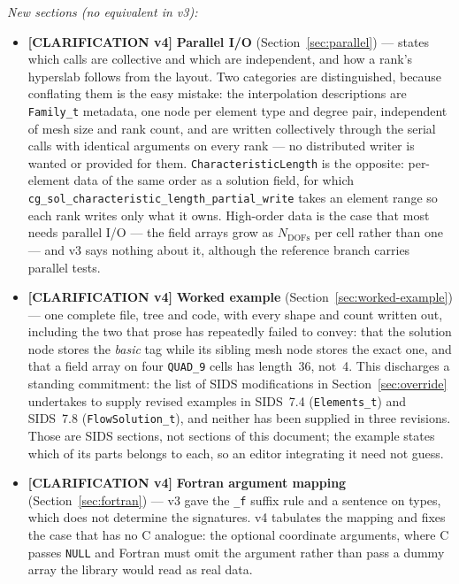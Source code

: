 \documentclass[11pt,letterpaper]{article}
\newif\ifvfourdraft
\newenvironment{v4block}{\ifvfourdraft\color{v4violet}\fi\ignorespaces}{\par}
\newcommand{\CLARIFYIV}{\ifvfourdraft
  \textcolor{v4violet}{\textbf{[CLARIFICATION v4]}}\else
  \textcolor{clarifybrown}{\textbf{[CLARIFICATION v4]}}\fi}
\begin{document}
{\begin{v4block}
\begin{enumerate}[leftmargin=1.4em,itemsep=0.5em]
\end{enumerate}

\medskip
\noindent\textit{New sections (no equivalent in v3):}
\begin{itemize}[nosep,leftmargin=1.5em]
  \item \CLARIFYIV{} \textbf{Parallel I/O} (Section~\ref{sec:parallel}) --- states
    which calls are collective and which are independent, and how a rank's
    hyperslab follows from the layout.  Two categories are distinguished, because
    conflating them is the easy mistake: the interpolation descriptions are
    \texttt{Family\_t} metadata, one node per element type and degree pair,
    independent of mesh size and rank count, and are written collectively through
    the serial calls with identical arguments on every rank --- no distributed
    writer is wanted or provided for them.  \texttt{CharacteristicLength} is the
    opposite: per-element data of the same order as a solution field, for which
    \texttt{cg\_sol\_characteristic\_length\_partial\_write} takes an element
    range so each rank writes only what it owns.  High-order data is the case that
    most needs parallel I/O --- the field arrays grow as $N_\mathrm{DOFs}$ per cell
    rather than one --- and v3 says nothing about it, although the reference branch
    carries parallel tests.

  \item \CLARIFYIV{} \textbf{Worked example} (Section~\ref{sec:worked-example})
    --- one complete file, tree and code, with every shape and count written out,
    including the two that prose has repeatedly failed to convey: that the
    solution node stores the \emph{basic} tag while its sibling mesh node stores
    the exact one, and that a field array on four \texttt{QUAD\_9} cells has
    length~36, not~4.  This discharges a standing commitment: the list of SIDS
    modifications in Section~\ref{sec:override} undertakes to supply revised
    examples in SIDS~7.4 (\texttt{Elements\_t}) and SIDS~7.8
    (\texttt{FlowSolution\_t}), and neither has been supplied in three revisions.
    Those are SIDS sections, not sections of this document; the example states
    which of its parts belongs to each, so an editor integrating it need not
    guess.

  \item \CLARIFYIV{} \textbf{Fortran argument mapping}
    (Section~\ref{sec:fortran}) --- v3 gave the \texttt{\_f} suffix rule and a
    sentence on types, which does not determine the signatures.  v4 tabulates the
    mapping and fixes the case that has no C analogue: the optional coordinate
    arguments, where C passes \texttt{NULL} and Fortran must omit the argument
    rather than pass a dummy array the library would read as real data.


\end{itemize}
\end{v4block}}
\end{document}
